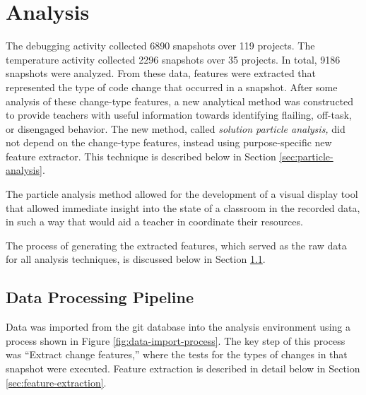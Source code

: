 \chapter{Analysis}
\label{chap:analysis}

The debugging activity collected 6890 snapshots over 119 projects. The temperature activity collected 2296 snapshots over 35 projects. In total, 9186 snapshots were analyzed. From these data, features were extracted that represented the type of code change that occurred in a snapshot. After some analysis of these change-type features, a new analytical method was constructed to provide teachers with useful information towards identifying flailing, off-task, or disengaged behavior. The new method, called \emph{solution particle analysis,} did not depend on the change-type features, instead using purpose-specific new feature extractor. This technique is described below in Section \ref{sec:particle-analysis}.

The particle analysis method allowed for the development of a visual display tool that allowed immediate insight into the state of a classroom in the recorded data, in such a way that would aid a teacher in coordinate their resources. 

The process of generating the extracted features, which served as the raw data for all analysis techniques, is discussed below in Section \ref{sec:data-processing}.


\section{Data Processing Pipeline}
\label{sec:data-processing}

Data was imported from the git database into the analysis environment using a process shown in Figure \ref{fig:data-import-process}. The key step of this process was ``Extract change features,'' where the tests for the types of changes in that snapshot were executed. Feature extraction is described in detail below in Section \ref{sec:feature-extraction}.

